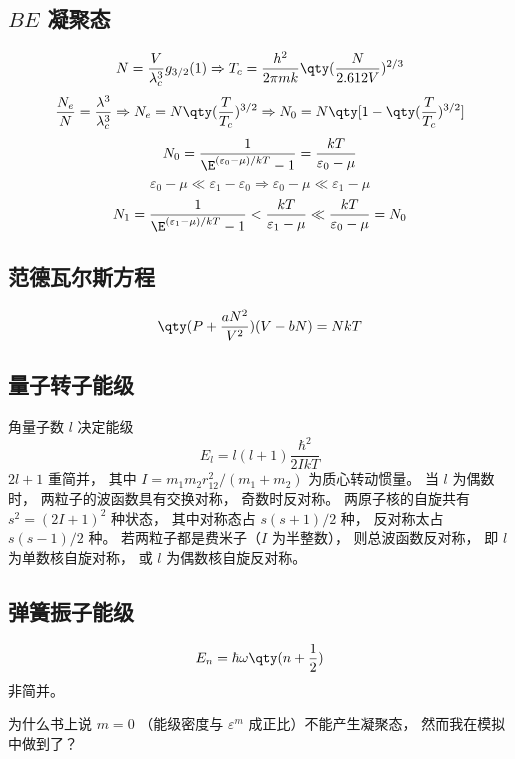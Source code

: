 \subsection{$BE$ 凝聚态}
\begin{equation}
N = \frac{V}{\lambda_c^3} g_{3/2} (1) \Rightarrow T_c = \frac{h^2}{2\pi mk} \qty(\frac{N}{2.612V})^{2/3}
\end{equation}
\begin{equation}
\frac{N_e}{N} = \frac{\lambda^3}{\lambda_c^3} \Rightarrow N_e = N\qty(\frac{T}{T_c})^{3/2} \Rightarrow {N_0} = N\qty[1 - \qty(\frac{T}{T_c})^{3/2}]
\end{equation}
\begin{equation}
N_0 = \frac{1}{\E^{(\varepsilon_0 - \mu )/kT} - 1} = \frac{kT}{\varepsilon_0 - \mu}
\end{equation}
\begin{equation}
\varepsilon_0 - \mu  \ll \varepsilon_1 - \varepsilon_0 \Rightarrow \varepsilon_0 - \mu  \ll \varepsilon_1 - \mu 
\end{equation}
\begin{equation}
N_1 = \frac{1}{\E^{(\varepsilon_1 - \mu )/kT} - 1} < \frac{kT}{\varepsilon_1 - \mu} \ll \frac{kT}{\varepsilon_0 - \mu } = N_0
\end{equation}
\subsection{范德瓦尔斯方程}
\begin{equation}
\qty(P + \frac{aN^2}{V^2}) (V - bN) = NkT
\end{equation}
\subsection{量子转子能级}
角量子数 $l$ 决定能级
\begin{equation}
E_l = l (l + 1)\frac{\hbar^2}{2IkT}
\end{equation}
$2l+1$ 重简并， 其中 $I = m_1 m_2 r_{12}^2/(m_1 + m_2)$ 为质心转动惯量。 当 $l$ 为偶数时， 两粒子的波函数具有交换对称， 奇数时反对称。 两原子核的自旋共有 $s^2 = (2I + 1)^2$ 种状态， 其中对称态占 $s(s + 1)/2$ 种， 反对称太占 $s(s - 1)/2$ 种。 若两粒子都是费米子（$I$ 为半整数）， 则总波函数反对称， 即 $l$ 为单数核自旋对称， 或 $l$ 为偶数核自旋反对称。

\subsection{弹簧振子能级}
\begin{equation}
E_n = \hbar \omega \qty(n + \frac12)
\end{equation}
非简并。

为什么书上说 $m = 0 $ （能级密度与 $\varepsilon^m$ 成正比）不能产生凝聚态， 然而我在模拟中做到了？